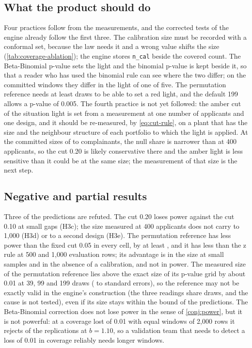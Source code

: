 \subsection{What the product should do}

Four practices follow from the measurements, and the corrected tests of the engine already follow the first three. The calibration size must be recorded with a conformal set, because the law needs it and a wrong value shifts the size (\cref{tab:coverage-ablation}); the engine stores \texttt{n\_cal} beside the covered count. The Beta-Binomial p-value sets the light and the binomial p-value is kept beside it, so that a reader who has used the binomial rule can see where the two differ; on the committed windows they differ in the light of one of five. The permutation reference needs at least \RedMinDraws{} draws to be able to set a red light, and the default 199 allows a p-value of 0.005. The fourth practice is not yet followed: the amber cut of the situation light is set from a measurement at one number of applicants and one design, and it should be re-measured, by \cref{eq:cut-rule}, on a plant that has the size and the neighbour structure of each portfolio to which the light is applied. At the committed sizes of \CmFairQMin{} to \CmFairQMax{} complainants, the null share is narrower than at 400 applicants, so the cut 0.20 is likely conservative there and the amber light is less sensitive than it could be at the same size; the measurement of that size is the next step.

\subsection{Negative and partial results}

Three of the predictions are refuted. The cut 0.20 loses power against the cut 0.10 at small gaps (H3c); the size measured at 400 applicants does not carry to 1,000 (H3d) or to a second design (H3e). The permutation reference has less power than the fixed cut 0.05 in every cell, by at least \ShPermPowerGapMin{}, and it has less than the z rule at 500 and 1,000 evaluation rows; its advantage is in the size at small samples and in the absence of a calibration, and not in power. The measured size of the permutation reference lies above the exact size of its p-value grid by about 0.01 at 39, 99 and 199 draws (\ShPermExcessZMin{} to \ShPermExcessZMax{} standard errors), so the reference may not be exactly valid in the engine's construction (the three readings share draws, and the cause is not tested), even if its size stays within the bound of the predictions. The Beta-Binomial correction does not lose power in the sense of \cref{conj:power}, but it is not powerful: at a coverage lost of 0.01 with equal windows of 2,000 rows it rejects \CovPowBBBTen{} of the replications at $b=1.10$, so a validation team that needs to detect a loss of 0.01 in coverage reliably needs longer windows.

